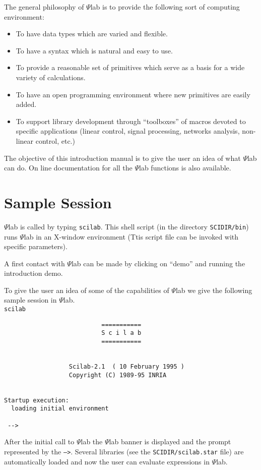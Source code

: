 	The general philosophy of $\Psi$lab is to provide the following
sort of computing environment:
\begin{itemize}
   \item To have data types which are varied and flexible.
   \item To have a syntax which is natural and easy to use.
   \item To provide a reasonable set of primitives which serve
	   as a basis for a wide variety of calculations.
   \item To have an open programming environment where new
	   primitives are easily added.
   \item To support library development through ``toolboxes'' of
         macros devoted to specific
	   applications (linear control, signal processing, 
	   networks analysis, non-linear control, etc.)
\end{itemize}

	The objective of this introduction manual is to give the user 
an idea of what $\Psi$lab can do. On line documentation for all the
$\Psi$lab functions is also available.

\section{Sample Session}

$\Psi$lab is called by typing {\tt scilab}.
This shell script  (in the directory {\tt SCIDIR/bin}) runs $\Psi$lab 
in an X-window environment (Ttis script file can be invoked with
specific parameters).

A first contact with $\Psi$lab can be made by clicking on ``demo''
and running the introduction demo.

	To give the user an idea of some of the capabilities of $\Psi$lab
we give the following sample session in $\Psi$lab.\\
\bigskip
{\tt scilab}
\begin{verbatim}
                           ===========
                           S c i l a b
                           ===========
 
 
                  Scilab-2.1  ( 10 February 1995 ) 
                  Copyright (C) 1989-95 INRIA 
 
 
Startup execution:
  loading initial environment
   
 -->

\end{verbatim}
After the initial call to $\Psi$lab the $\Psi$lab banner is displayed
and the prompt represented by the {\tt -->}.  Several libraries
(see the {\tt SCIDIR/scilab.star} file) are automatically loaded and 
now the user can evaluate expressions in $\Psi$lab.


